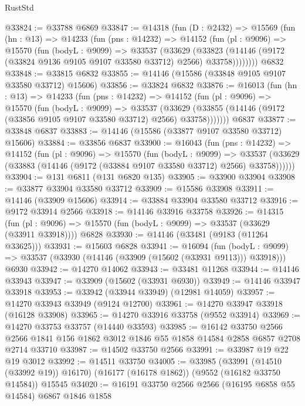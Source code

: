 \begin{lexlean}{RustStd}
\begin{coremodule}
@33824 := @33788 @6869
@33847 := @14318
    (fun (D : @2432) =>
    @15569
      (fun (hn : @13) =>
      @14233
        (fun (pns : @14232) =>
        @14152
          (fun (pl : @9096) =>
          @15570
            (fun (bodyL : @9099) =>
            @33537
              (@33629
                (@33823
                  (@14146 (@9172 (@33824 @9136 @9105 @9107 @33580 @33712) @2566) @33758))))))))
    @6832
@33848 := @33815 @6832
@33855 := @14146 (@15586 (@33848 @9105 @9107 @33580 @33712) @15606)
@33856 := @33824 @6832
@33876 := @16013
    (fun (hn : @13) =>
    @14233
      (fun (pns : @14232) =>
      @14152
        (fun (pl : @9096) =>
        @15570
          (fun (bodyL : @9099) =>
          @33537
            (@33629 (@33855 (@14146 (@9172 (@33856 @9105 @9107 @33580 @33712) @2566) @33758)))))))
    @6837
@33877 := @33848 @6837
@33883 := @14146 (@15586 (@33877 @9107 @33580 @33712) @15606)
@33884 := @33856 @6837
@33900 := @16043
    (fun (pns : @14232) =>
    @14152
      (fun (pl : @9096) =>
      @15570
        (fun (bodyL : @9099) =>
        @33537 (@33629 (@33883 (@14146 (@9172 (@33884 @9107 @33580 @33712) @2566) @33758))))))
@33904 := @131 @6811 (@131 @6820 @135)
@33905 := @33900 @33904
@33908 := @33877 @33904 @33580 @33712
@33909 := @15586 @33908
@33911 := @14146 (@33909 @15606)
@33914 := @33884 @33904 @33580 @33712
@33916 := @9172 @33914 @2566
@33918 := @14146 @33916 @33758
@33926 := @14315
    (fun (pl : @9096) => @15570 (fun (bodyL : @9099) => @33537 (@33629 (@33911 @33918))))
    @6828
@33930 := @14146 (@33481 (@9183 (@11264 @33625)))
@33931 := @15603 @6828
@33941 := @16094
    (fun (bodyL : @9099) => @33537 (@33930 (@14146 (@33909 (@15602 (@33931 @9113))) @33918)))
    @6930
@33942 := @14270 @14062
@33943 := @33481 @11268
@33944 := @14146 @33943
@33947 := @33909 (@15602 (@33931 @6930))
@33949 := @14146 @33947 @33918
@33953 := @33942 (@33944 @33949) (@12981 @14059)
@33957 := @14270 @33943 @33949 (@9124 @12700)
@33961 := @14270 @33947 @33918 (@16128 @33908)
@33965 := @14270 @33916 @33758 (@9552 @33914)
@33969 := @14270 @33753 @33757 (@14440 @33593)
@33985 := @16142
    @33750
    @2566
    @2566
    @1841
    @156
    @1862
    @3012
    @1846
    @55
    @1858
    @14584
    @2858
    @6857
    @2708
    @2714
    @33710
@33987 := @14502 @33750 @2566
@33991 := @33987 @19 @22 @19 @3012
@33992 := @14511 @33750
@34005 := @33985
    (@33991 (@14510 (@33992 @19)) @16170)
    (@16177 (@16178 @1862))
    (@9552 (@16182 @33750 @14584))
    @15545
@34020 := @16191
    @33750
    @2566
    @2566
    (@16195 @6858 @55 @14584)
    @6867
    @1846
    @1858

\end{coremodule}
\end{lexlean}
